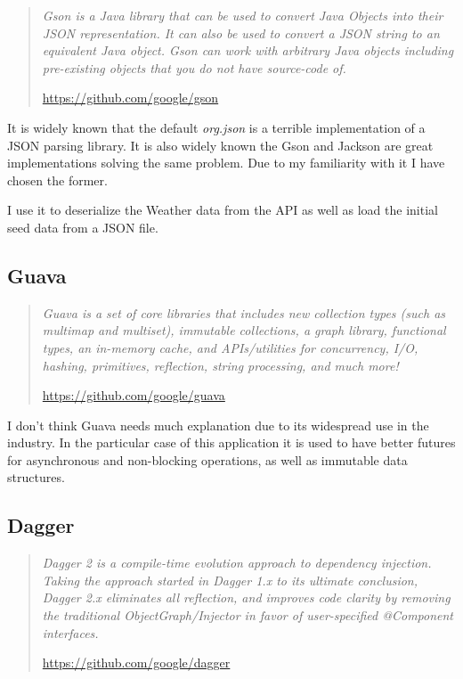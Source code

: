 \documentclass[english,a4paper,]{report}
\begin{document}
\begin{quote}
\emph{Gson is a Java library that can be used to convert Java Objects
into their JSON representation. It can also be used to convert a JSON
string to an equivalent Java object. Gson can work with arbitrary Java
objects including pre-existing objects that you do not have source-code
of.}

\url{https://github.com/google/gson}
\end{quote}

It is widely known that the default \emph{org.json} is a terrible
implementation of a JSON parsing library. It is also widely known the
Gson and Jackson are great implementations solving the same problem. Due
to my familiarity with it I have chosen the former.

I use it to deserialize the Weather data from the API as well as load
the initial seed data from a JSON file.

\hypertarget{guava}{%
\subsection{Guava}\label{guava}}

\begin{quote}
\emph{Guava is a set of core libraries that includes new collection
types (such as multimap and multiset), immutable collections, a graph
library, functional types, an in-memory cache, and APIs/utilities for
concurrency, I/O, hashing, primitives, reflection, string processing,
and much more!}

\url{https://github.com/google/guava}
\end{quote}

I don't think Guava needs much explanation due to its widespread use in
the industry. In the particular case of this application it is used to
have better futures for asynchronous and non-blocking operations, as
well as immutable data structures.

\hypertarget{dagger}{%
\subsection{Dagger}\label{dagger}}

\begin{quote}
\emph{Dagger 2 is a compile-time evolution approach to dependency
injection. Taking the approach started in Dagger 1.x to its ultimate
conclusion, Dagger 2.x eliminates all reflection, and improves code
clarity by removing the traditional ObjectGraph/Injector in favor of
user-specified @Component interfaces.}

\url{https://github.com/google/dagger}
\end{quote}
\end{document}
